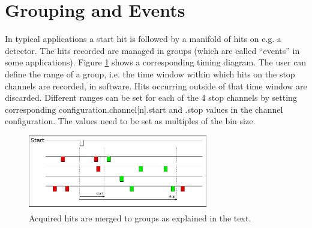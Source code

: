 \section{Grouping and Events}
\label{grouping}
In typical applications a start hit is followed by a manifold of hits on e.g. a detector. 
The hits recorded are managed in groups (which are called ``events'' in some applications). 
Figure \ref{fig:grouping} shows a corresponding timing diagram. The user can define the range of a group, i.e. the time window within which hits 
on the stop channels are recorded, in software. Hits occurring outside of that time window are discarded. 
 Different ranges can be set for each of the 4 stop channels by setting corresponding configuration.channel[n].start and .stop values in the channel configuration. 
The values need to be set as multiples of the bin size.

%
\begin{figure}[ht]
    \begin{center}
        \includegraphics[width=0.7\textwidth]{figures/grouping.pdf}
        \caption{Acquired hits are merged to groups as explained in the text.\label{fig:grouping}}
    \end{center}
\end{figure}
%
